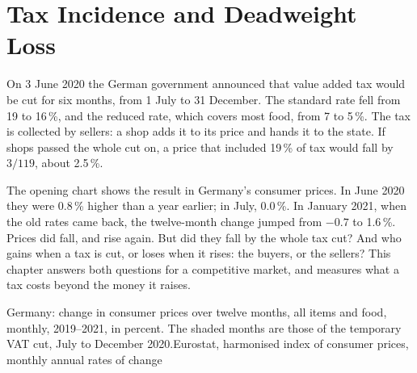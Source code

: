 \chapter{Tax Incidence and Deadweight Loss}\label{ch:g10:tax-incidence}

On 3 June 2020 the German government announced that value added tax would be cut for six months, from 1 July to 31 December. The
standard rate fell from 19 to 16\,\%, and the reduced rate, which covers most food, from 7 to 5\,\%. The tax is collected by sellers:
a shop adds it to its price and hands it to the state. If shops passed the whole cut on, a price that included 19\,\% of tax would fall
by $3/119$, about 2.5\,\%.

The opening chart shows the result in Germany's consumer prices. In June 2020 they were 0.8\,\% higher than a year earlier; in July, 0.0\,\%.
In January 2021, when the old rates came back, the twelve-month change jumped from $-0.7$ to 1.6\,\%. Prices did fall, and rise again. But
did they fall by the whole tax cut? And who gains when a tax is cut, or loses when it rises: the buyers, or the sellers? This chapter answers
both questions for a competitive market, and measures what a tax costs beyond the money it raises.

\begin{openingchart}{Germany: change in consumer prices over twelve months, all items and food, monthly, 2019--2021, in percent. The shaded months
are those of the temporary VAT cut, July to December 2020.}{Eurostat, harmonised index of consumer prices, monthly annual rates of change}
\end{openingchart}

